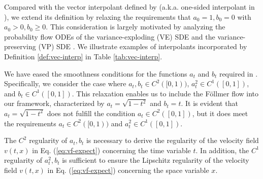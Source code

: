 \documentclass[twoside,11pt]{article}
\def\paref#1{(\ref{#1})}
\numberwithin{equation}{section}
\begin{document}
\begin{remark}
Compared with the vector interpolant defined by \citet{albergo2023building} (a.k.a. one-sided interpolant in \citet{albergo2023stochastic}), we extend its definition by relaxing the requirements that $a_0 = 1, b_0 = 0$ with $a_0 > 0, b_0 \ge 0$. This consideration is largely motivated by analyzing the probability flow ODEs of the variance-exploding (VE) SDE and the variance-preserving (VP) SDE \citep{song2021scorebased}.
We illustrate examples of interpolants incorporated by Definition \ref{def:vec-interp} in Table \ref{tab:vec-interp}.
\end{remark}


\begin{remark}
We have eased the smoothness conditions for the functions $a_t$ and $b_t$ required in
\citet{albergo2023building}.
 Specifically, we consider the case where $a_t, b_t \in C^2([0,1))$, $a_t^2 \in C^1([0, 1])$, and $b_t \in C^1([0, 1])$. This relaxation enables us to include the Föllmer flow into our framework, characterized by $a_t = \sqrt{1-t^2}$ and $b_t = t$. It is evident that $a_t = \sqrt{1-t^2}$ does not fulfill the condition $a_t \in C^2([0,1])$, but it does meet the requirements $a_t \in C^2([0,1))$ and $a_t^2 \in C^1([0, 1])$.
\end{remark}

\begin{remark}
    The $C^2$ regularity of $a_t, b_t$ is necessary to derive the regularity of the velocity field $v(t, x)$ in Eq. \paref{eq:vf-expect} concerning the time variable $t$. In addition, the $C^1$ regularity of $a_t^2, b_t$ is sufficient to ensure the Lipschitz regularity of the velocity field $v(t, x)$ in Eq. \paref{eq:vf-expect} concerning the space variable $x$.
\end{remark}
\end{document}
